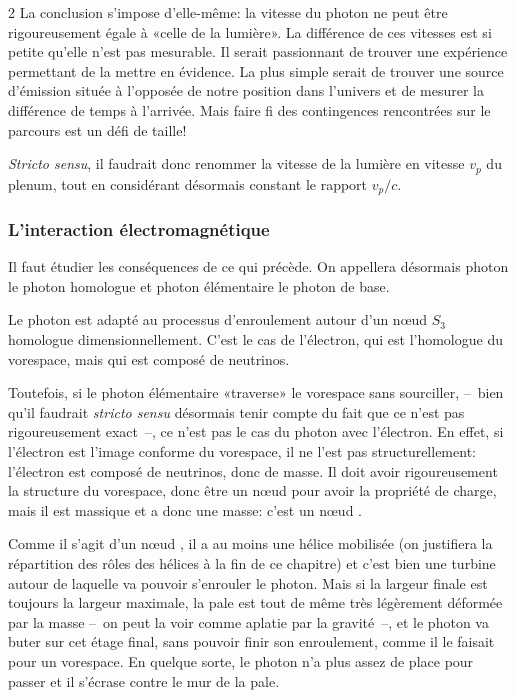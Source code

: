 \begin{multicols}{2}
La conclusion s'impose d'elle-même: la vitesse du photon ne peut être
rigoureusement égale à «celle de la lumière». La différence de ces
vitesses est si petite qu'elle n'est pas mesurable. Il serait
passionnant de trouver une expérience permettant de la mettre en
évidence. La plus simple serait de trouver une source d'émission
située à l'opposée de notre position dans l'univers et de mesurer la
différence de temps à l'arrivée. Mais faire fi des contingences
rencontrées sur le parcours est un défi de taille!

\textit{Stricto sensu}, il faudrait donc renommer la vitesse de la lumière en
vitesse $v_p$ du plenum, tout en considérant désormais constant le
rapport $v_p/c$.

\subsubsection{L'interaction électromagnétique}

Il faut étudier les conséquences de ce qui précède. On appellera
désormais photon le photon homologue et photon élémentaire le photon
de base.

Le photon est adapté au processus d'enroulement autour d'un nœud $S_3$
homologue dimensionnellement. C'est le cas de l'électron, qui est
l'homologue du vorespace, mais qui est composé de neutrinos.

Toutefois, si le photon élémentaire «traverse» le vorespace sans
sourciller, --~bien qu'il faudrait \textit{stricto sensu} désormais tenir
compte du fait que ce n'est pas rigoureusement exact~--, ce n'est pas le cas
du photon avec l'électron. En effet, si l'électron est l'image
conforme du vorespace, il ne l'est pas structurellement: l'électron
est composé de neutrinos, donc de masse. Il doit avoir rigoureusement
la structure du vorespace, donc être un nœud  pour avoir la
propriété de charge, mais il est massique et a donc une masse: c'est
un nœud . 

Comme il s'agit d'un nœud , il a au moins une hélice
mobilisée (on justifiera la répartition des rôles des hélices à la fin de ce chapitre) et c'est bien une turbine autour de laquelle va pouvoir
s'enrouler le photon. Mais si la largeur finale est toujours la
largeur maximale, la pale est tout de même très légèrement déformée
par la masse --~on peut la voir comme aplatie par la gravité~--, et le
photon va buter sur cet étage final, sans pouvoir finir son
enroulement, comme il le faisait pour un vorespace. En quelque sorte, le photon n'a
plus assez de place pour passer et il s'écrase contre le mur de la
pale.


\end{multicols}
